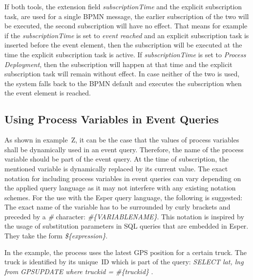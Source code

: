 If both tools, the extension field \textit{subscriptionTime} and the explicit subscription task, are used for a single BPMN message, the earlier subscription of the two will be executed, the second subscription will have no effect.
That means for example if the \textit{subscriptionTime} is set to \textit{event reached} and an explicit subscription task is inserted before the event element, then the subscription will be executed at the time the explicit subscription task is active.
If \textit{subscriptionTime} is set to \textit{Process Deployment}, then the subscription will happen at that time and the explicit subscription task will remain without effect.
In case neither of the two is used, the system falls back to the BPMN default and executes the subscription when the event element is reached.

\subsection{Using Process Variables in Event Queries}



As shown in example~Z, it can be the case that the values of process variables shall be dynamically used in an event query.
Therefore, the name of the process variable should be part of the event query. At the time of subscription, the mentioned variable is dynamically replaced by its current value.
The exact notation for including process variables in event queries can vary depending on the applied query language as it may not interfere with any existing notation schemes.
For the use with the Esper query language, the following is suggested: The exact name of the variable has to be surrounded by curly brackets and preceded by a \textit{\#} character: \textit{\#\{VARIABLENAME\}}.
This notation is inspired by the usage of substitution parameters in SQL queries that are embedded in Esper. They take the form \textit{\$\{expression\}}.

In the example, the process uses the latest GPS position for a certain truck. The truck is identified by its unique~ID which is part of the query: \textit{SELECT lat, lng from GPSUPDATE where truckid = \#\{truckid\} }.

